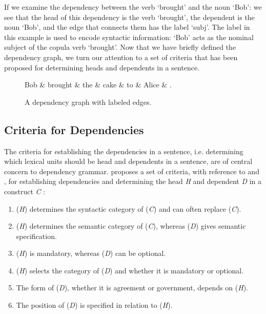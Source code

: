 If we examine the dependency between the verb `brought' and the noun `Bob': we see that the head of this dependency is the verb `brought', the dependent is the noun `Bob', and the edge that connects them has the label `subj'. The label in this example is used to encode syntactic information: `Bob' acts as the nominal subject of the copula verb `brought'. Now that we have briefly defined the dependency graph, we turn our attention to a set of criteria that has been proposed for determining heads and dependents in a sentence.

\begin{figure}
    \begin{dependency}[]
        \begin{deptext}[column sep=1em, row sep=.1ex]
            Bob \& brought \& the \& cake \& to \& Alice \& . \\
        \end{deptext}
    \end{dependency}
    \caption{A dependency graph with labeled edges.}
    \label{dep1}
\end{figure}

\subsection{Criteria for Dependencies}
\label{criteria}

The criteria for establishing the dependencies in a sentence, i.e. determining which lexical units should be head and dependents in a sentence, are of central concern to dependency grammar. \citeauthor{Niv:05} proposes a set of criteria, with reference to \citeauthor{Zwicky:85} and \citeauthor{Hudson:90}, for establishing dependencies and determining the head \textit{H} and dependent \textit{D} in a construct \textit{C} \cite{Zwicky:85, Hudson:90, Niv:05}:

\begin{enumerate}
\item (\textit{H}) determines the syntactic category of (\textit{C}) and can often replace (\textit{C}).
\item (\textit{H}) determines the semantic category of (\textit{C}), whereas (\textit{D}) gives semantic specification.
\item (\textit{H}) is mandatory, whereas (\textit{D}) can be optional.
\item (\textit{H}) selects the category of (\textit{D}) and whether it is mandatory or optional.
\item The form of (\textit{D}), whether it is agreement or government, depends on (\textit{H}).
\item The position of (\textit{D}) is specified in relation to (\textit{H}).
\end{enumerate}

